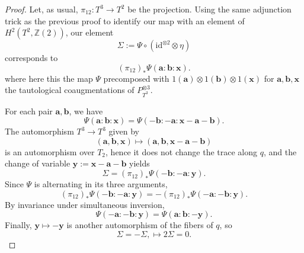 \documentclass[10pt,a4paper]{amsart}
\newcommand{\Z}{\mathbb{Z}}
\begin{document}
\begin{proof}
    Let, as usual, $\pi_{12}:T^3\longrightarrow T^2$ be the projection. Using the same adjunction trick as the previous proof to identify our map with an element of $H^2(T^2, \Z(2))$, our element 
    \[
        \Sigma:=\Psi\circ(\mathrm{id}^{\otimes2}\otimes\eta)
    \]
    corresponds to
    \[
        (\pi_{12})_*\Psi(\mathbf a:\mathbf b:\mathbf x).
    \]
    where here this the map $\Psi$ precomposed with $1(\mathbf{a})\otimes 1(\mathbf{b}) \otimes 1(\mathbf{x})$ for $\mathbf{a},\mathbf{b},\mathbf{x}$ the tautological coaugmentations of $P^{\otimes 3}_{T^3}$.

    For each pair $\mathbf a,\mathbf b$, we have
    \[
    \Psi(\mathbf a:\mathbf b:\mathbf x)
    =
    \Psi(-\mathbf b:-\mathbf a:\mathbf x-\mathbf a-\mathbf b).
    \]
    The automorphism $T^3\to T^3$ given by
    \[
    (\mathbf a,\mathbf b,\mathbf x)
    \mapsto
    (\mathbf a,\mathbf b,\mathbf x-\mathbf a-\mathbf b)
    \]
    is an automorphism over $T_2$, hence it does not change the trace along
    $q$, and the change of variable $\mathbf y:=\mathbf x-\mathbf a-\mathbf b$ yields
    \[
    \Sigma
    =
    (\pi_{12})_*\Psi(-\mathbf b:-\mathbf a:\mathbf y).
    \]
    Since $\Psi$ is alternating in its three arguments,
    \[
    (\pi_{12})_*\Psi(-\mathbf b:-\mathbf a:\mathbf y)
    =
    -(\pi_{12})_*\Psi(-\mathbf a:-\mathbf b:\mathbf y).
    \]
    By invariance under simultaneous inversion,
    \[
    \Psi(-\mathbf a:-\mathbf b:\mathbf y)
    =
    \Psi(\mathbf a:\mathbf b:-\mathbf y).
    \]
    Finally, $\mathbf y\mapsto-\mathbf y$ is another automorphism of the fibers of $q$, so
    \[
    \Sigma
    =
    -\Sigma, \mapsto 2\Sigma =0.
    \]
\end{proof}
\end{document}

